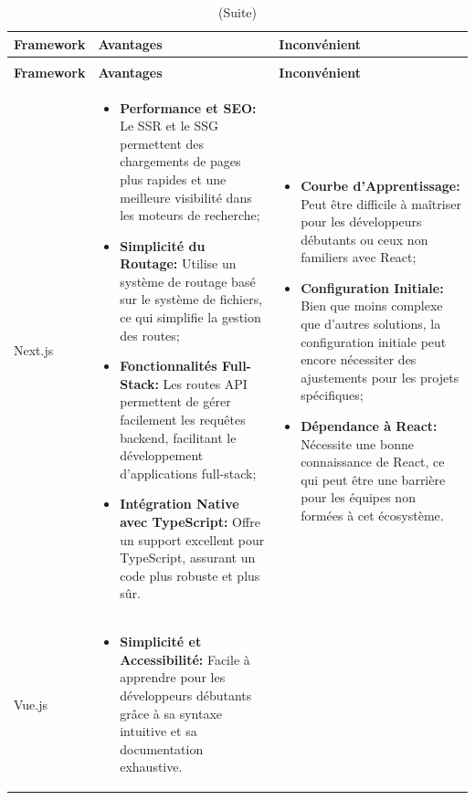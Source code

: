 \documentclass[12pt]{report}
\begin{document}
				\begin{longtable}{|p{3cm}|p{5.5cm}|p{5.5cm}|} 
						\caption{Comparaison entre Next.js et Vue.js.} 
						\label{tab:frameworkFront}\\ 
						\hline 
						\textbf{Framework}  & \textbf{Avantages} & \textbf{Inconvénient}\\ 
						\hline 
						\endfirsthead 	
						\caption[]{(Suite)}\\ 
						\hline 
						\textbf{Framework}  & \textbf{Avantages} & \textbf{Inconvénient}\\ 
						\hline 
						\endhead
						Next.js&
						\begin{itemize}
							\item \textbf{Performance et SEO:} Le SSR et le SSG permettent des chargements de pages plus rapides et une meilleure visibilité dans les moteurs de recherche;
							\item \textbf{Simplicité du Routage:} Utilise un système de routage basé sur le système de fichiers, ce qui simplifie la gestion des routes;
							\item \textbf{Fonctionnalités Full-Stack:} Les routes API permettent de gérer facilement les requêtes backend, facilitant le développement d'applications full-stack;
							\item \textbf{Intégration Native avec TypeScript:} Offre un support excellent pour TypeScript, assurant un code plus robuste et plus sûr.
						\end{itemize}
						&
						\begin{itemize}
							\item \textbf{Courbe d'Apprentissage:} Peut être difficile à maîtriser pour les développeurs débutants ou ceux non familiers avec React;
							\item \textbf{Configuration Initiale:} Bien que moins complexe que d'autres solutions, la configuration initiale peut encore nécessiter des ajustements pour les projets spécifiques;
							\item \textbf{Dépendance à React:} Nécessite une bonne connaissance de React, ce qui peut être une barrière pour les équipes non formées à cet écosystème.
						\end{itemize}\\						
						\hline
						Vue.js&
						\begin{itemize}
							\item \textbf{Simplicité et Accessibilité:} Facile à apprendre pour les développeurs débutants grâce à sa syntaxe intuitive et sa documentation exhaustive.

\end{itemize}
\end{longtable}
\end{document}

